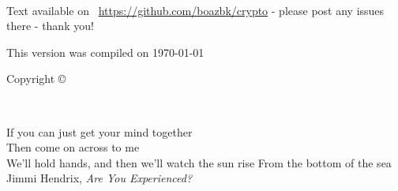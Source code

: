 \frontmatter


\maketitle



\newpage
\begin{fullwidth}
~\vfill
\thispagestyle{empty}
\setlength{\parindent}{0pt}
\setlength{\parskip}{\baselineskip}

Text available on \faGithub\  \url{https://github.com/boazbk/crypto} - please post any issues there - thank you!

This version was compiled on \today\ \currenttime

Copyright \copyright\ \the\year\ \thanklessauthor

\doclicenseThis



\end{fullwidth}



\cleardoublepage
\thispagestyle{empty}%
~\vfill
\begin{doublespace}
\nohyphenation
\noindent If you can just get your mind together \\
\noindent  Then come on across to me \\
\noindent We'll hold hands, and then we'll watch the sun rise
\noindent  From the bottom of the sea \\

Jimmi Hendrix, \emph{Are You Experienced?}
\end{doublespace}
\vfill
\vfill








\cleardoublepage

\setcounter{tocdepth}{1}
\setcounter{secnumdepth}{3}


\cleardoublepage
\setcounter{tocdepth}{3}
\tableofcontents


\cleardoublepage
